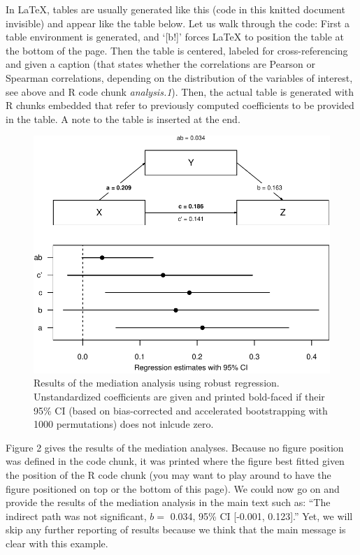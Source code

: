 \documentclass[
]{article}
\begin{document}
In LaTeX, tables are usually generated like this (code in this knitted
document invisible) and appear like the table below. Let us walk through
the code: First a table environment is generated, and `{[}b!{]}' forces
LaTeX to position the table at the bottom of the page. Then the table is
centered, labeled for cross-referencing and given a caption (that states
whether the correlations are Pearson or Spearman correlations, depending
on the distribution of the variables of interest, see above and R code
chunk \emph{analysis.1}). Then, the actual table is generated with R
chunks embedded that refer to previously computed coefficients to be
provided in the table. A note to the table is inserted at the end.

\begin{figure}
\centering
\includegraphics{RM_03_KeepingCalm_files/figure-latex/analysis.3-1.pdf}
\caption{Results of the mediation analysis using robust regression.
Unstandardized coefficients are given and printed bold-faced if their
95\% CI (based on bias-corrected and accelerated bootstrapping with 1000
permutations) does not inlcude zero.}
\end{figure}

Figure 2 gives the results of the mediation analyses. Because no figure
position was defined in the code chunk, it was printed where the figure
best fitted given the position of the R code chunk (you may want to play
around to have the figure positioned on top or the bottom of this page).
We could now go on and provide the results of the mediation analysis in
the main text such as: ``The indirect path was not significant, \(b=\)
0.034, 95\% CI {[}-0.001, 0.123{]}.'' Yet, we will skip any further
reporting of results because we think that the main message is clear
with this example.
\end{document}
